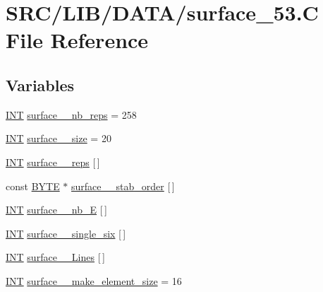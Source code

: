 \hypertarget{surface__53_8_c}{}\section{S\+R\+C/\+L\+I\+B/\+D\+A\+T\+A/surface\+\_\+53.C File Reference}
\label{surface__53_8_c}
\subsection*{Variables}
\begin{DoxyCompactItemize}
\item 
\mbox{\hyperlink{galois_8h_a09fddde158a3a20bd2dcadb609de11dc}{I\+NT}} \mbox{\hyperlink{surface__53_8_c_a8b5bdaaab53b5c72a6c02fbc3b8a3a2e}{surface\+\_\+\_\+nb\+\_\+reps}} = 258
\item 
\mbox{\hyperlink{galois_8h_a09fddde158a3a20bd2dcadb609de11dc}{I\+NT}} \mbox{\hyperlink{surface__53_8_c_a8ab6ff7ec00d52ebd705f245d75bc7f1}{surface\+\_\+\_\+size}} = 20
\item 
\mbox{\hyperlink{galois_8h_a09fddde158a3a20bd2dcadb609de11dc}{I\+NT}} \mbox{\hyperlink{surface__53_8_c_aa6794e547c4ad69aad18c57923ce04b4}{surface\+\_\+\_\+reps}} \mbox{[}$\,$\mbox{]}
\item 
const \mbox{\hyperlink{galois_8h_ab6cc7b4aeb6ea31aba2b3fbfc83ff5e6}{B\+Y\+TE}} $\ast$ \mbox{\hyperlink{surface__53_8_c_a234a28ff0fb22172bdb999751bc148d7}{surface\+\_\+\_\+stab\+\_\+order}} \mbox{[}$\,$\mbox{]}
\item 
\mbox{\hyperlink{galois_8h_a09fddde158a3a20bd2dcadb609de11dc}{I\+NT}} \mbox{\hyperlink{surface__53_8_c_a673a804ef53de3e8cf68143f3de031a9}{surface\+\_\+\_\+nb\+\_\+E}} \mbox{[}$\,$\mbox{]}
\item 
\mbox{\hyperlink{galois_8h_a09fddde158a3a20bd2dcadb609de11dc}{I\+NT}} \mbox{\hyperlink{surface__53_8_c_af211e55ad9e95589e2ae90789197a999}{surface\+\_\+\_\+single\+\_\+six}} \mbox{[}$\,$\mbox{]}
\item 
\mbox{\hyperlink{galois_8h_a09fddde158a3a20bd2dcadb609de11dc}{I\+NT}} \mbox{\hyperlink{surface__53_8_c_a6f8eaa0fcc87ad83116070e1aab87185}{surface\+\_\+\_\+\+Lines}} \mbox{[}$\,$\mbox{]}
\item 
\mbox{\hyperlink{galois_8h_a09fddde158a3a20bd2dcadb609de11dc}{I\+NT}} \mbox{\hyperlink{surface__53_8_c_ae1bd77d55e4a5dd213aa2cfc8fdf76b9}{surface\+\_\+\_\+make\+\_\+element\+\_\+size}} = 16
\item 

\end{DoxyCompactItemize}

